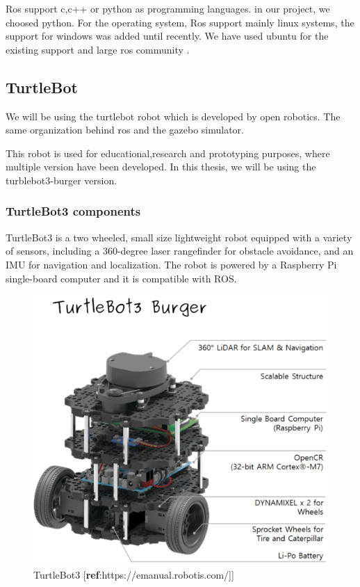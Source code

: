 \documentclass[12pt]{extarticle}
\begin{document}
Ros support  c,c++ or python as programming languages. in our project, we choosed python. 
For the operating system, Ros support mainly linux systems, the support for windows was added until recently. We have used ubuntu for the existing support and large ros community .







\subsection{TurtleBot}
We will be using the turtlebot robot which is developed by open robotics. The same organization behind ros and the gazebo simulator.

This robot is used for educational,research and prototyping purposes, where multiple version have been developed. In this thesis, we will be using the turblebot3-burger version.\cite{turtlebot}

\subsubsection{TurtleBot3 components}
TurtleBot3 is a two wheeled, small  size  lightweight  robot  equipped with a variety of sensors, including a 360-degree laser rangefinder for obstacle avoidance, and an IMU for navigation and localization. The robot is powered by a Raspberry Pi single-board computer and it is compatible with ROS.
 \begin{figure}[h]  
\centering
\includegraphics[scale=0.4]{turtlebot3_burger_components.png}
\caption[TurtleBot3]{TurtleBot3 [\textbf{ref}:https://emanual.robotis.com/]]}
\end{figure}
\end{document}
